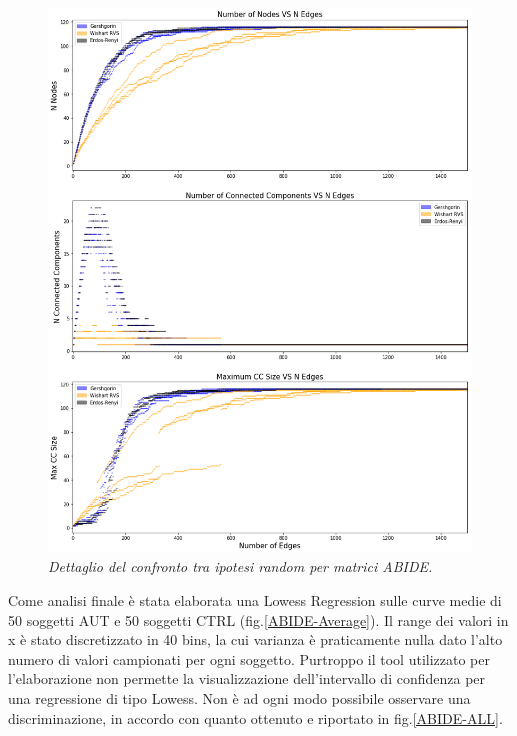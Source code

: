 \documentclass[12pt,openright,a4paper]{article}
\begin{document}
\begin{figure}[!h]
\centering
\includegraphics[scale=0.4]{ALL-RNetwork-growth}
\caption{\textit{Dettaglio del confronto tra ipotesi random per matrici ABIDE.}}
\label{ABIDE-RAND}
\end{figure}

Come analisi finale è stata elaborata una Lowess Regression sulle curve medie di 50 soggetti AUT e 50 soggetti CTRL (fig.\ref{ABIDE-Average}). Il range dei valori in x è stato discretizzato in 40 bins, la cui varianza è praticamente nulla dato l'alto numero di valori campionati per ogni soggetto.   Purtroppo il tool utilizzato per l'elaborazione non permette la visualizzazione dell'intervallo di confidenza per una regressione di tipo Lowess. Non è ad ogni modo possibile osservare una discriminazione, in accordo con quanto ottenuto e riportato in fig.\ref{ABIDE-ALL}.
\end{document}
